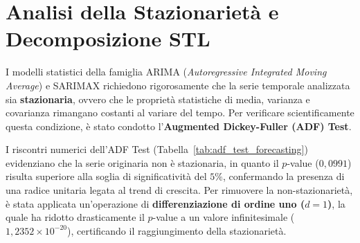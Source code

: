 \section{Analisi della Stazionarietà e Decomposizione STL}
\label{sec:stazionarieta_forecasting}

I modelli statistici della famiglia ARIMA (\textit{Autoregressive Integrated Moving Average}) e SARIMAX richiedono rigorosamente che la serie temporale analizzata sia \textbf{stazionaria}, ovvero che le proprietà statistiche di media, varianza e covarianza rimangano costanti al variare del tempo. Per verificare scientificamente questa condizione, è stato condotto l'\textbf{Augmented Dickey-Fuller (ADF) Test}.

\begin{table}[H]
\centering
{}
\caption{Risultati dell'Augmented Dickey-Fuller (ADF) Test sulla serie originaria e sulla serie differenziata.}
\label{tab:adf_test_forecasting}
\end{table}

I riscontri numerici dell'ADF Test (Tabella~\ref{tab:adf_test_forecasting}) evidenziano che la serie originaria non è stazionaria, in quanto il $p$-value ($0,0991$) risulta superiore alla soglia di significatività del $5\%$, confermando la presenza di una radice unitaria legata al trend di crescita. Per rimuovere la non-stazionarietà, è stata applicata un'operazione di \textbf{differenziazione di ordine uno ($d=1$)}, la quale ha ridotto drasticamente il $p$-value a un valore infinitesimale ($1,2352 \times 10^{-20}$), certificando il raggiungimento della stazionarietà.

